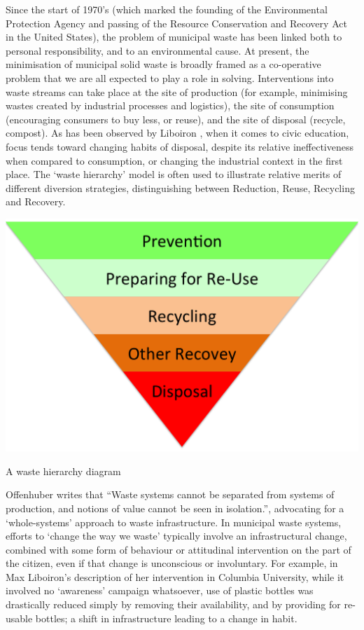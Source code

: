 \documentclass[nofonts,nols,justified,nobib]{tufte-book}
\begin{document}
Since the start of 1970's (which marked the founding of the Environmental Protection Agency and passing of the Resource Conservation and Recovery Act in the United States), the problem of municipal waste has been linked both to personal responsibility, and to an environmental cause. At present, the minimisation of municipal solid waste is broadly framed as a co-operative problem that we are all expected to play a role in solving. Interventions into waste streams can take place at the site of production (for example, minimising wastes created by industrial processes and logistics), the site of consumption (encouraging consumers to buy less, or reuse), and the site of disposal (recycle, compost). As has been observed by Liboiron \cite{liboiron_against_2014}, when it comes to civic education, focus tends toward changing habits of disposal, despite its relative ineffectiveness when compared to consumption, or changing the industrial context in the first place. The `waste hierarchy' model is often used to illustrate relative merits of different diversion strategies, distinguishing between Reduction, Reuse, Recycling and Recovery.


\begin{marginfigure}
\includegraphics[width=\textwidth]{img/1/waste-hierarchy.png}
\caption{A waste hierarchy diagram}
\end{marginfigure}

Offenhuber writes that ``Waste systems cannot be separated from systems of production, and notions of value cannot be seen in isolation.'', advocating for a `whole-systems' approach to waste infrastructure. In municipal waste systems, efforts to `change the way we waste' typically involve an infrastructural change, combined with some form of behaviour or attitudinal intervention on the part of the citizen, even if that change is unconscious or involuntary. For example, in Max Liboiron's description of her intervention in Columbia University, while it involved no `awareness' campaign whatsoever, use of plastic bottles was drastically reduced simply by removing their availability, and by providing for re-usable bottles; a shift in infrastructure leading to a change in habit. \cite{liboiron_against_2014}
\end{document}
